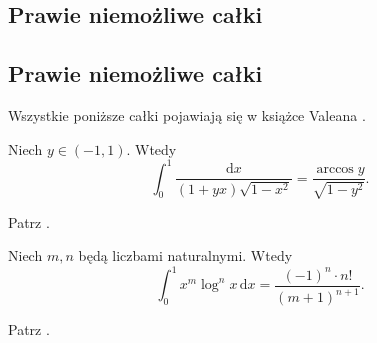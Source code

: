 \subsection{Prawie niemożliwe całki}
\subsection{Prawie niemożliwe całki} %
Wszystkie poniższe całki pojawiają się w książce Valeana \cite{valean19}.

\begin{problem}
    \label{valean_grundpreis}%
    Niech $y \in (-1, 1)$.
    Wtedy
    \begin{equation}
        \int_0^1 \frac{\mathrm{d}x}{(1+yx) \sqrt{1-x^2}} = \frac{\arccos y}{\sqrt{1-y^2}}.
    \end{equation}
\end{problem}

\begin{solution} %
    Patrz \cite[s. 1]{valean19}. %
\end{solution} %

\begin{problem}
    \label{valean_zeugenstand}%
    Niech $m, n$ będą liczbami naturalnymi.
    Wtedy
    \begin{equation}
        \int_0^1 x^m \log^n x \,\mathrm{d} x = \frac{(-1)^n \cdot n!}{(m+1)^{n+1}}.
    \end{equation}
\end{problem}

\begin{solution} %
    Patrz \cite[s. 1]{valean19}. %
\end{solution} %

%